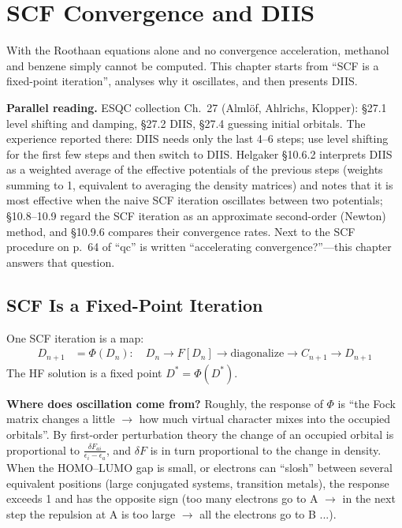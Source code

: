 \chapter{SCF Convergence and DIIS}
\label{ch:scf}

With the Roothaan equations alone and no convergence acceleration, methanol and benzene simply cannot be computed. This chapter starts from ``SCF is a fixed-point iteration'', analyses why it oscillates, and then presents DIIS.

\textbf{Parallel reading.} ESQC collection Ch.~27 (Almlöf, Ahlrichs, Klopper): §27.1 level shifting and damping, §27.2 DIIS, §27.4 guessing initial orbitals. The experience reported there: DIIS needs only the last 4--6 steps; use level shifting for the first few steps and then switch to DIIS. Helgaker §10.6.2 interprets DIIS as a weighted average of the effective potentials of the previous steps (weights summing to 1, equivalent to averaging the density matrices) and notes that it is most effective when the naive SCF iteration oscillates between two potentials; §10.8--10.9 regard the SCF iteration as an approximate second-order (Newton) method, and §10.9.6 compares their convergence rates. Next to the SCF procedure on p.~64 of “qc” is written “accelerating convergence?”---this chapter answers that question.

\section{SCF Is a Fixed-Point Iteration}

One SCF iteration is a map:
\begin{align*}
D_{n+1} &= \Phi(D_n): \quad D_n \rightarrow F[D_n] \rightarrow \text{diagonalize} \rightarrow C_{n+1} \rightarrow D_{n+1}
\end{align*}
The HF solution is a fixed point $D^* = \Phi(D^*)$.

\textbf{Where does oscillation come from?} Roughly, the response of $\Phi$ is ``the Fock matrix changes a little $\to$ how much virtual character mixes into the occupied orbitals''. By first-order perturbation theory the change of an occupied orbital is proportional to $\frac{\delta F_{ai}}{\epsilon_i - \epsilon_a}$, and $\delta F$ is in turn proportional to the change in density. When the HOMO--LUMO gap is small, or electrons can ``slosh'' between several equivalent positions (large conjugated systems, transition metals), the response exceeds 1 and has the opposite sign (too many electrons go to A $\to$ in the next step the repulsion at A is too large $\to$ all the electrons go to B ...).

